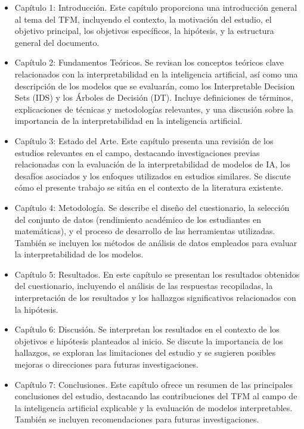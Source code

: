 \begin{itemize}
    \item Capítulo 1: Introducción. Este capítulo proporciona una introducción general al tema del TFM, incluyendo el contexto, la motivación del estudio, el objetivo principal, los objetivos específicos, la hipótesis, y la estructura general del documento.
    
    \item Capítulo 2: Fundamentos Teóricos. Se revisan los conceptos teóricos clave relacionados con la interpretabilidad en la inteligencia artificial, así como una descripción de los modelos que se evaluarán, como los Interpretable Decision Sets (IDS) y los Árboles de Decisión (DT). Incluye definiciones de términos, explicaciones de técnicas y metodologías relevantes, y una discusión sobre la importancia de la interpretabilidad en la inteligencia artificial.
    
    \item Capítulo 3: Estado del Arte. Este capítulo presenta una revisión de los estudios relevantes en el campo, destacando investigaciones previas relacionadas con la evaluación de la interpretabilidad de modelos de IA, los desafíos asociados y los enfoques utilizados en estudios similares. Se discute cómo el presente trabajo se sitúa en el contexto de la literatura existente.
    
    \item Capítulo 4: Metodología. Se describe el diseño del cuestionario, la selección del conjunto de datos (rendimiento académico de los estudiantes en matemáticas), y el proceso de desarrollo de las herramientas utilizadas. También se incluyen los métodos de análisis de datos empleados para evaluar la interpretabilidad de los modelos.
    
    \item Capítulo 5: Resultados. En este capítulo se presentan los resultados obtenidos del cuestionario, incluyendo el análisis de las respuestas recopiladas, la interpretación de los resultados y los hallazgos significativos relacionados con la hipótesis.
    
    \item Capítulo 6: Discusión. Se interpretan los resultados en el contexto de los objetivos e hipótesis planteados al inicio. Se discute la importancia de los hallazgos, se exploran las limitaciones del estudio y se sugieren posibles mejoras o direcciones para futuras investigaciones.
    
    \item Capítulo 7: Conclusiones. Este capítulo ofrece un resumen de las principales conclusiones del estudio, destacando las contribuciones del TFM al campo de la inteligencia artificial explicable y la evaluación de modelos interpretables. También se incluyen recomendaciones para futuras investigaciones.
\end{itemize}